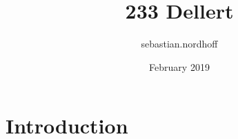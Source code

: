 \documentclass{article}
\title{233 Dellert}
\author{sebastian.nordhoff }
\date{February 2019}
\begin{document}
\maketitle

\section{Introduction}
\end{document}
